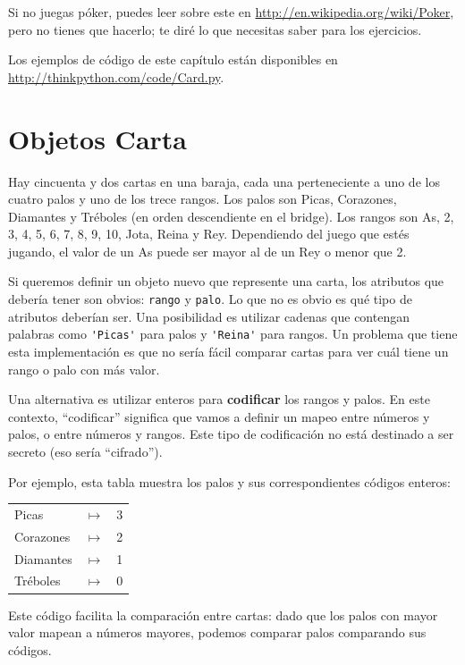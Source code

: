 \documentclass[10pt]{book}
\begin{document}
Si no juegas
póker, puedes leer sobre este en
\url{http://en.wikipedia.org/wiki/Poker}, pero no tienes que hacerlo; 
te diré lo que necesitas saber para los ejercicios.

Los ejemplos de código de
este capítulo están disponibles en
\url{http://thinkpython.com/code/Card.py}.


\section{Objetos Carta}

Hay cincuenta y dos cartas en una baraja, cada una perteneciente a uno de
los cuatro palos y uno de los trece rangos.  Los palos son Picas, Corazones,
Diamantes y Tréboles (en orden descendiente en el bridge).  Los rangos son
As, 2, 3, 4, 5, 6, 7, 8, 9, 10, Jota, Reina y Rey.  Dependiendo del
juego que estés jugando, el valor de un As puede ser mayor al de un Rey
o menor que 2.

Si queremos definir un objeto nuevo que represente una carta, los
atributos que debería tener son obvios: {\tt rango} y
{\tt palo}.  Lo que no es obvio es qué tipo de atributos
deberían ser.  Una posibilidad es utilizar cadenas que contengan palabras como
\verb"'Picas'" para palos y \verb"'Reina'" para rangos.  Un problema que
tiene esta implementación es que no sería fácil comparar cartas para
ver cuál tiene un rango o palo con más valor.

Una alternativa es utilizar enteros para {\bf codificar} los rangos y palos.
En este contexto, ``codificar'' significa que vamos a definir un mapeo
entre números y palos, o entre números y rangos.  Este
tipo de codificación no está destinado a ser secreto (eso
sería ``cifrado'').

\newcommand{\mymapsto}{$\mapsto$}

Por ejemplo, esta tabla muestra los palos y sus correspondientes
códigos enteros:

\begin{tabular}{l c l}
Picas & \mymapsto & 3 \\
Corazones & \mymapsto & 2 \\
Diamantes & \mymapsto & 1 \\
Tréboles & \mymapsto & 0
\end{tabular}

Este código facilita la comparación entre cartas: dado que los palos con mayor valor mapean a
números mayores, podemos comparar palos comparando sus códigos.
\end{document}
